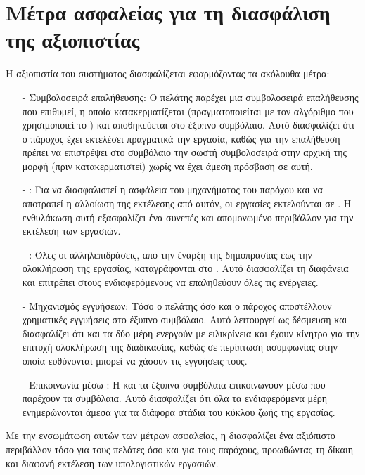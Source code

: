 \section{Μέτρα ασφαλείας για τη διασφάλιση της αξιοπιστίας}
Η αξιοπιστία του συστήματος διασφαλίζεται εφαρμόζοντας τα ακόλουθα μέτρα:
\begin{itemize}
\item[-] Συμβολοσειρά επαλήθευσης: Ο πελάτης παρέχει μια συμβολοσειρά επαλήθευσης που επιθυμεί, η οποία κατακερματίζεται (πραγματοποιείται  με τον αλγόριθμο  που χρησιμοποιεί το ) και αποθηκεύεται στο έξυπνο συμβόλαιο. Αυτό διασφαλίζει ότι ο πάροχος έχει εκτελέσει πραγματικά την εργασία, καθώς για την επαλήθευση πρέπει να επιστρέψει στο συμβόλαιο την σωστή συμβολοσειρά στην αρχική της μορφή (πριν κατακερματιστεί) χωρίς να έχει άμεση πρόσβαση σε αυτή.
\item[-] : Για να διασφαλιστεί η ασφάλεια του μηχανήματος του παρόχου και να αποτραπεί η αλλοίωση της εκτέλεσης από αυτόν, οι εργασίες εκτελούνται σε . Η ενθυλάκωση αυτή εξασφαλίζει ένα συνεπές και απομονωμένο περιβάλλον για την εκτέλεση των εργασιών.
\item[-] : Όλες οι αλληλεπιδράσεις, από την έναρξη της δημοπρασίας έως την ολοκλήρωση της εργασίας, καταγράφονται στο . Αυτό διασφαλίζει τη διαφάνεια και επιτρέπει στους ενδιαφερόμενους να επαληθεύουν όλες τις ενέργειες. 
\item[-] Μηχανισμός εγγυήσεων:  Τόσο ο πελάτης όσο και ο πάροχος αποστέλλουν χρηματικές εγγυήσεις στο έξυπνο συμβόλαιο. Αυτό λειτουργεί ως δέσμευση και διασφαλίζει ότι και τα δύο μέρη ενεργούν με ειλικρίνεια και έχουν κίνητρο για την επιτυχή ολοκλήρωση της διαδικασίας, καθώς σε περίπτωση ασυμφωνίας στην οποία ευθύνονται μπορεί να χάσουν τις εγγυήσεις τους. 
\item[-] Επικοινωνία μέσω : Η  και τα έξυπνα συμβόλαια επικοινωνούν μέσω  που παρέχουν τα συμβόλαια. Αυτό διασφαλίζει ότι όλα τα ενδιαφερόμενα μέρη ενημερώνονται άμεσα για τα διάφορα στάδια του κύκλου ζωής της εργασίας. 
\end{itemize}

Με την ενσωμάτωση αυτών των μέτρων ασφαλείας, η  διασφαλίζει ένα αξιόπιστο περιβάλλον τόσο για τους πελάτες όσο και για τους παρόχους, προωθώντας τη δίκαιη και διαφανή εκτέλεση των υπολογιστικών εργασιών.